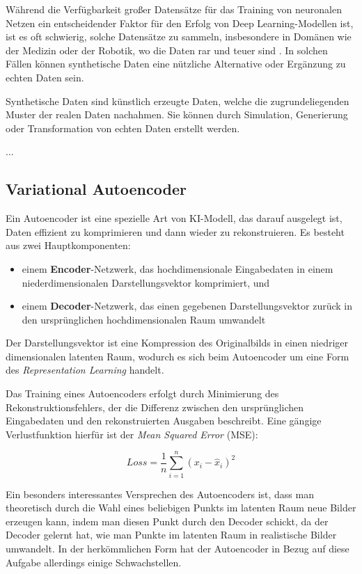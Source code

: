 Während die Verfügbarkeit großer Datensätze für das Training von neuronalen Netzen ein entscheidender Faktor für den Erfolg von Deep Learning-Modellen ist, ist es oft schwierig, solche Datensätze zu sammeln, insbesondere in Domänen wie der Medizin oder der Robotik, wo die Daten rar und teuer sind \cite{}. In solchen Fällen können synthetische Daten eine nützliche Alternative oder Ergänzung zu echten Daten sein.

Synthetische Daten sind künstlich erzeugte Daten, welche die zugrundeliegenden Muster der realen Daten nachahmen. Sie können durch Simulation, Generierung oder Transformation von echten Daten erstellt werden.

...

\subsection{Variational Autoencoder}

Ein Autoencoder ist eine spezielle Art von KI-Modell, das darauf ausgelegt ist, Daten effizient zu komprimieren und dann wieder zu rekonstruieren. Es besteht aus zwei Hauptkomponenten: \parencite{Foster2020}

\begin{itemize}
	\item einem \textbf{Encoder}-Netzwerk, das hochdimensionale Eingabedaten in einem niederdimensionalen Darstellungsvektor komprimiert, und
	\item einem \textbf{Decoder}-Netzwerk, das einen gegebenen Darstellungsvektor zurück in den ursprünglichen hochdimensionalen Raum umwandelt
\end{itemize}

Der Darstellungsvektor ist eine Kompression des Originalbilds in einen niedriger dimensionalen latenten Raum, wodurch es sich beim Autoencoder um eine Form des \textit{Representation Learning} handelt.

Das Training eines Autoencoders erfolgt durch Minimierung des Rekonstruktionsfehlers, der die Differenz zwischen den ursprünglichen Eingabedaten und den rekonstruierten Ausgaben beschreibt. Eine gängige Verlustfunktion hierfür ist der \textit{Mean Squared Error} (MSE):

$$Loss=\frac{1}{n}\sum_{i=1}^n (x_i-\hat{x}_i)^2$$

Ein besonders interessantes Versprechen des Autoencoders ist, dass man theoretisch durch die Wahl eines beliebigen Punkts im latenten Raum neue Bilder erzeugen kann, indem man diesen Punkt durch den Decoder schickt, da der Decoder gelernt hat, wie man Punkte im latenten Raum in realistische Bilder umwandelt. \parencite{Foster2020} In der herkömmlichen Form hat der Autoencoder in Bezug auf diese Aufgabe allerdings einige Schwachstellen.

